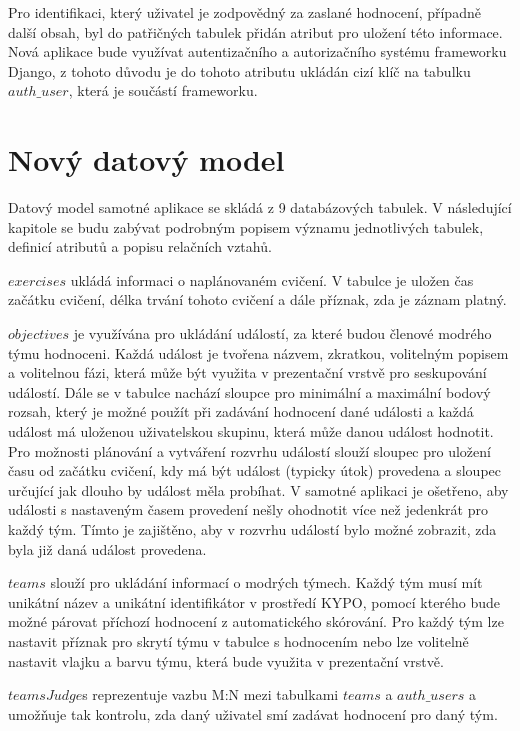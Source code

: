 \documentclass[
  digital, %
  twoside, %
  table,   %
  lof,     %
  lot,     %
]{fithesis3}
\begin{document}
Pro identifikaci, který uživatel je zodpovědný za zaslané hodnocení, případně další obsah, byl do patřičných tabulek přidán atribut pro uložení této informace. Nová aplikace bude využívat autentizačního a autorizačního systému frameworku Django, z tohoto důvodu je do tohoto atributu ukládán cizí klíč na tabulku $auth\_user$, která je součástí frameworku.

\section{Nový datový model}

Datový model samotné aplikace se skládá z 9 databázových tabulek. V následující kapitole se budu zabývat podrobným popisem významu jednotlivých tabulek, definicí atributů a popisu relačních vztahů.

$exercises$ ukládá informaci o naplánovaném cvičení. V tabulce je uložen čas začátku cvičení, délka trvání tohoto cvičení a dále příznak, zda je záznam platný.

$objectives$ je využívána pro ukládání událostí, za které budou členové modrého týmu hodnoceni. Každá událost je tvořena názvem, zkratkou, volitelným popisem a volitelnou fázi, která může být využita v prezentační vrstvě pro seskupování událostí. Dále se v tabulce nachází sloupce pro minimální a maximální bodový rozsah, který je možné použít při zadávání hodnocení dané události a každá událost má uloženou uživatelskou skupinu, která může danou událost hodnotit. Pro možnosti plánování a vytváření rozvrhu událostí slouží sloupec pro uložení času od začátku cvičení, kdy má být událost (typicky útok) provedena a sloupec určující jak dlouho by událost měla probíhat. V samotné aplikaci je ošetřeno, aby události s nastaveným časem provedení nešly ohodnotit více než jedenkrát pro každý tým. Tímto je zajištěno, aby v rozvrhu událostí bylo možné zobrazit, zda byla již daná událost provedena. 

$teams$ slouží pro ukládání informací o modrých týmech. Každý tým musí mít unikátní název a unikátní identifikátor v prostředí KYPO, pomocí kterého bude možné párovat příchozí hodnocení z automatického skórování. Pro každý tým lze nastavit příznak pro skrytí týmu v tabulce s hodnocením nebo lze volitelně nastavit vlajku a barvu týmu, která bude využita v prezentační vrstvě.

$teamsJudge$s reprezentuje vazbu M:N mezi tabulkami $teams$ a $auth\_users$ a umožňuje tak kontrolu, zda daný uživatel smí zadávat hodnocení pro daný tým. 
\end{document}
